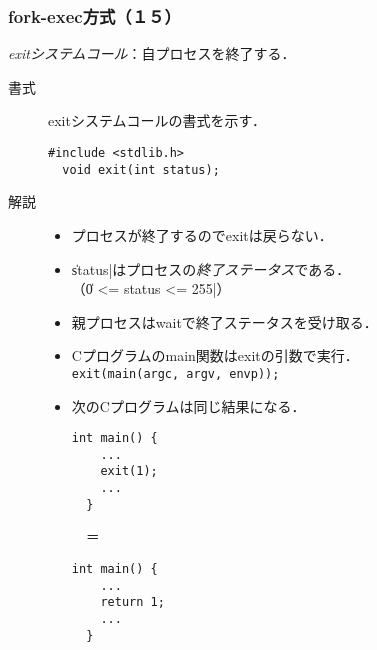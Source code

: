 \documentclass{beamer}                 %
\begin{document}
\begin{frame}[fragile]
  \frametitle{fork-exec方式（１５）}
  \emph{exitシステムコール}：自プロセスを終了する．

  \begin{description}
  \item[書式] exitシステムコールの書式を示す．
\begin{lstlisting}[numbers=none]
  #include <stdlib.h>
  void exit(int status);
\end{lstlisting}

  \item[解説]
    \begin{itemize}
    \item プロセスが終了するのでexitは戻らない．
    \item \|status|はプロセスの\emph{終了ステータス}である．\\
      （\|0 <= status <= 255|）\\
    \item 親プロセスはwaitで終了ステータスを受け取る．
    \item Cプログラムのmain関数はexitの引数で実行．\\
    \vfill
    \texttt{exit(main(argc, argv, envp));}
    \vfill
    \item 次のCプログラムは同じ結果になる．\\
      \begin{minipage}{0.3\columnwidth}
\begin{lstlisting}[numbers=none]
  int main() {
    ...
    exit(1);
    ...
  }
\end{lstlisting}
      \end{minipage} ~~＝~~~
      \begin{minipage}{0.3\columnwidth}
\begin{lstlisting}[numbers=none]
  int main() {
    ...
    return 1;
    ...
  }
\end{lstlisting}
      \end{minipage}
    \end{itemize}
  \end{description}
\end{frame}
\end{document}
